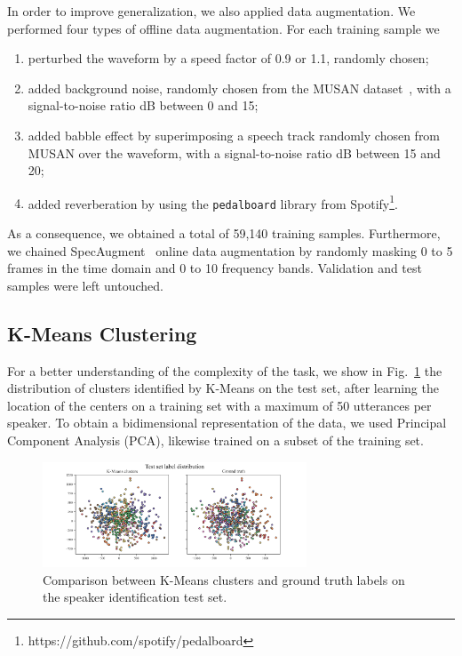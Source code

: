 \documentclass[conference]{IEEEtran}
\begin{document}
In order to improve generalization, we also applied data augmentation. We performed four types of offline data augmentation. For each training sample we
\begin{enumerate}
    \item perturbed the waveform by a speed factor of 0.9 or 1.1, randomly chosen;
    \item added background noise, randomly chosen from the MUSAN dataset~\cite{snyder2015musan}, with a signal-to-noise ratio dB between 0 and 15;
    \item added babble effect by superimposing a speech track randomly chosen from MUSAN over the waveform, with a signal-to-noise ratio dB between 15 and 20;
    \item added reverberation by using the \texttt{pedalboard} library from Spotify\footnote{https://github.com/spotify/pedalboard}.
\end{enumerate}
As a consequence, we obtained a total of 59,140 training samples. Furthermore, we chained SpecAugment~\cite{park2019specaug} online data augmentation by randomly masking 0 to 5 frames in the time domain and 0 to 10 frequency bands. Validation and test samples were left untouched.

\subsection{K-Means Clustering}

For a better understanding of the complexity of the task, we show in Fig.~\ref{fig:k_means} the distribution of clusters identified by K-Means on the test set, after learning the location of the centers on a training set with a maximum of 50 utterances per speaker. To obtain a bidimensional representation of the data, we used Principal Component Analysis (PCA), likewise trained on a subset of the training set.

\begin{figure}[htbp]
    \centerline{\includegraphics[width=0.7\textwidth]{img/k_means.png}}
    \caption{Comparison between K-Means clusters and ground truth labels on the speaker identification test set.}
    \label{fig:k_means}
\end{figure}
\end{document}

